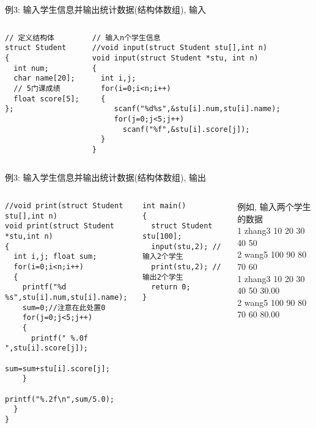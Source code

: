 \begin{frame}{例3: 输入学生信息并输出统计数据(结构体数组), 输入}
\begin{columns}[T]
\begin{lstlisting}
// 定义结构体
struct Student 
{ 
  int num;
  char name[20];
  // 5门课成绩
  float score[5];
};
\end{lstlisting}
\begin{lstlisting}[frame=leftline]
// 输入n个学生信息
//void input(struct Student stu[],int n)
void input(struct Student *stu, int n)
{
  int i,j;
  for(i=0;i<n;i++) 
  {
     scanf("%d%s",&stu[i].num,stu[i].name);
     for(j=0;j<5;j++) 
       scanf("%f",&stu[i].score[j]);
  } 
}
\end{lstlisting}
\end{columns}
\end{frame}

\begin{frame}{例3: 输入学生信息并输出统计数据(结构体数组), 输出}
\vspace{-0.5cm}
\begin{columns}[T]
\begin{lstlisting}
//void print(struct Student stu[],int n)
void print(struct Student *stu,int n)
{
  int i,j; float sum;
  for(i=0;i<n;i++)
  {
    printf("%d %s",stu[i].num,stu[i].name);
    sum=0;//注意在此处置0
    for(j=0;j<5;j++)
    { 
      printf(" %.0f ",stu[i].score[j]);
      sum=sum+stu[i].score[j];
    }
    printf("%.2f\n",sum/5.0);
  }
}
\end{lstlisting}
\begin{lstlisting}[frame=leftline]
int main()
{ 
  struct Student stu[100];
  input(stu,2); // 输入2个学生
  print(stu,2); // 输出2个学生
  return 0;
}
\end{lstlisting}
例如, 输入两个学生的数据\\
1 zhang3 10 20 30 40 50\\
2 wang5 100 90 80 70 60\\
1 zhang3 10  20  30  40  50 30.00\\
2 wang5 100  90  80  70  60 80.00
\end{columns}
\medskip
\end{frame}

